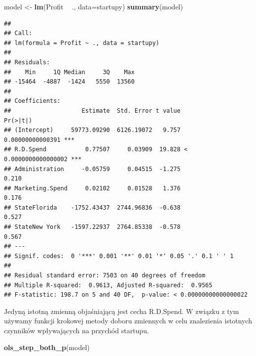 \documentclass[]{book}
\newenvironment{Shaded}{\begin{snugshade}}{\end{snugshade}}
\newcommand{\DataTypeTok}[1]{\textcolor[rgb]{0.13,0.29,0.53}{#1}}
\newcommand{\KeywordTok}[1]{\textcolor[rgb]{0.13,0.29,0.53}{\textbf{#1}}}
\newcommand{\NormalTok}[1]{#1}
\newcommand{\OperatorTok}[1]{\textcolor[rgb]{0.81,0.36,0.00}{\textbf{#1}}}
\newcommand{\StringTok}[1]{\textcolor[rgb]{0.31,0.60,0.02}{#1}}
\begin{document}
\begin{Shaded}
\begin{Highlighting}[]
\NormalTok{model <-}\StringTok{ }\KeywordTok{lm}\NormalTok{(Profit }\OperatorTok{~}\StringTok{ }\NormalTok{., }\DataTypeTok{data=}\NormalTok{startupy)}
\KeywordTok{summary}\NormalTok{(model)}
\end{Highlighting}
\end{Shaded}

\begin{verbatim}
## 
## Call:
## lm(formula = Profit ~ ., data = startupy)
## 
## Residuals:
##    Min     1Q Median     3Q    Max 
## -15464  -4887  -1424   5550  13560 
## 
## Coefficients:
##                    Estimate  Std. Error t value             Pr(>|t|)    
## (Intercept)     59773.09290  6126.19072   9.757     0.00000000000391 ***
## R.D.Spend           0.77507     0.03909  19.828 < 0.0000000000000002 ***
## Administration     -0.05759     0.04515  -1.275                0.210    
## Marketing.Spend     0.02102     0.01528   1.376                0.176    
## StateFlorida    -1752.43437  2744.96836  -0.638                0.527    
## StateNew York   -1597.22937  2764.85338  -0.578                0.567    
## ---
## Signif. codes:  0 '***' 0.001 '**' 0.01 '*' 0.05 '.' 0.1 ' ' 1
## 
## Residual standard error: 7503 on 40 degrees of freedom
## Multiple R-squared:  0.9613, Adjusted R-squared:  0.9565 
## F-statistic: 198.7 on 5 and 40 DF,  p-value: < 0.00000000000000022
\end{verbatim}

Jedyną istotną zmienną objaśniającą jest cecha R.D.Spend. W związku z tym używamy funkcji krokowej metody doboru zmiennych w celu znalezienia istotnych czynników wpływających na przychód startupu.

\begin{Shaded}
\begin{Highlighting}[]
\KeywordTok{ols_step_both_p}\NormalTok{(model)}
\end{Highlighting}
\end{Shaded}
\end{document}
